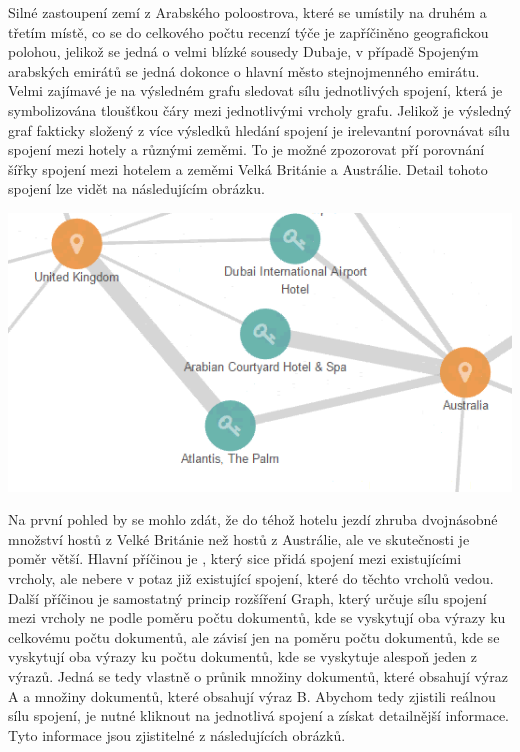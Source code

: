 \documentclass[czech,BP]{thesiskiv}
\begin{document}
Silné zastoupení zemí z Arabského poloostrova, které se umístily na druhém a třetím místě, co se do celkového počtu recenzí týče je zapříčiněno geografickou polohou, jelikož se jedná o velmi blízké sousedy Dubaje, v případě Spojeným arabských emirátů se jedná dokonce o hlavní město stejnojmenného emirátu.
Velmi zajímavé je na výsledném grafu sledovat sílu jednotlivých spojení, která je symbolizována tloušťkou čáry mezi jednotlivými vrcholy grafu. Jelikož je výsledný graf fakticky složený z více výsledků hledání spojení je irelevantní porovnávat sílu spojení mezi hotely a různými zeměmi. To je možné zpozorovat pří porovnání šířky spojení mezi hotelem  a zeměmi Velká Británie a Austrálie. Detail tohoto spojení lze vidět na následujícím obrázku.
\begin{center}
	\includegraphics[width=\textwidth]{img/detail_spojeni.PNG}
\end{center}
 Na první pohled by se mohlo zdát, že do téhož hotelu jezdí zhruba dvojnásobné množství hostů z Velké Británie než hostů z Austrálie, ale ve skutečnosti je poměr větší. Hlavní příčinou je , který sice přidá spojení mezi existujícími vrcholy, ale nebere v potaz již existující spojení, které do těchto vrcholů vedou. Další příčinou je samostatný princip rozšíření Graph, který určuje sílu spojení mezi vrcholy ne podle poměru počtu dokumentů, kde se vyskytují oba výrazy ku celkovému počtu dokumentů, ale závisí jen na poměru počtu dokumentů, kde se vyskytují oba výrazy ku počtu dokumentů, kde se vyskytuje alespoň jeden z výrazů. Jedná se tedy vlastně o průnik množiny dokumentů, které obsahují výraz A a množiny dokumentů, které obsahují výraz B. Abychom tedy zjistili reálnou sílu spojení, je nutné kliknout na jednotlivá spojení a získat detailnější informace. Tyto informace jsou zjistitelné z následujících obrázků.\\
\end{document}
